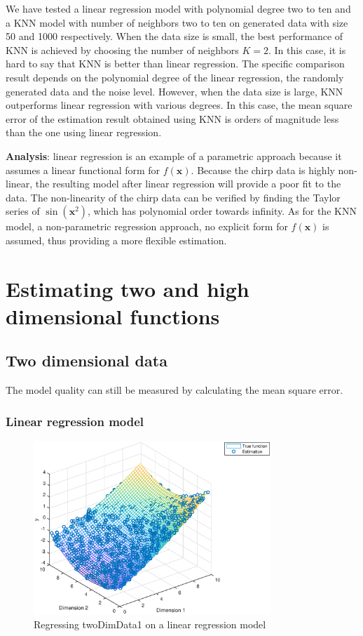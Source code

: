 \documentclass[]{article}
\begin{document}
We have tested a linear regression model with polynomial degree two to ten and a KNN model with number of neighbors two to ten on generated data with size 50 and 1000 respectively. When the data size is small, the best performance of KNN is achieved by choosing the number of neighbors $K=2$. In this case, it is hard to say that KNN is better than linear regression. The specific comparison result depends on the polynomial degree of the linear regression, the randomly generated data and the noise level. However, when the data size is large, KNN outperforms linear regression with various degrees. In this case, the mean square error of the estimation result obtained using KNN is orders of magnitude less than the one using linear regression. 


\textbf{Analysis}: linear regression is an example of a parametric approach because it assumes a linear functional form for $f(\mathbf{x})$. Because the chirp data is highly non-linear, the resulting model after linear regression will provide a poor fit to the data. The non-linearity of the chirp data can be verified by finding the Taylor series of $\sin(\mathbf{x}^2)$, which has polynomial order towards infinity. As for the KNN model, a non-parametric regression approach, no explicit form for $f(\mathbf{x})$ is assumed, thus providing a more flexible estimation. 


\section{Estimating two and high dimensional functions}

\subsection{Two dimensional data}

The model quality can still be measured by calculating the  mean square error.

\subsubsection{Linear regression model}
\begin{figure}[H]
	\caption{Regressing twoDimData1 on a linear regression model}
	\label{fig:twodimData1}
	\centering
	\includegraphics[width=0.8\textwidth]{project41c1}
\end{figure}
\end{document}
